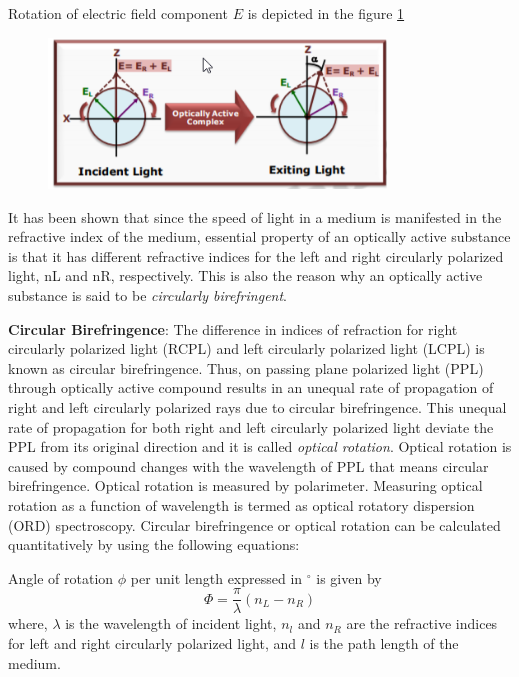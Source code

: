 	Rotation of electric field component $ E $ is depicted  in the figure \ref{fig:polari-fig}
	\begin{figure}[!htb]
		\centering
		\includegraphics[width=0.8\textwidth]{Experiments/Polarimeter-fig1.png}
		\label{fig:polari-fig}
	\end{figure}
	
	It has been shown that since the speed of light in a medium is manifested in the refractive index of the medium, essential property of an optically active substance is that it has different refractive indices for the left and right circularly polarized light, nL and nR, respectively. This is also the reason why an optically active substance is said to be \textit{circularly birefringent}.
	
	{\textbf{Circular Birefringence}}: The difference in indices of refraction for right circularly polarized light (RCPL) and left circularly polarized light (LCPL) is known as circular birefringence. Thus, on passing plane polarized light (PPL) through optically active compound results in an unequal rate of propagation of right and left circularly polarized rays due to circular birefringence. This unequal rate of propagation for both right and left circularly polarized light deviate the PPL from its original direction and it is called \emph{optical rotation}. Optical rotation is caused by compound changes with the wavelength of PPL that means circular birefringence. Optical rotation is measured by polarimeter. Measuring optical rotation as a function of wavelength is termed as optical rotatory dispersion (ORD) spectroscopy. Circular birefringence or optical rotation can be calculated quantitatively by using the following equations:
	
	Angle of rotation $\phi$ per unit length expressed in $^{\circ}$ is given by
	\begin{equation}
		\label{eqn:Angle of rotation per unit length}
		\Phi=\frac{\pi}{\lambda}\left(n_{L}-n_{R}\right)
	\end{equation}
	where, $\lambda$ is the wavelength of incident light, $n_l$ and $n_R$ are the refractive indices for left and right circularly polarized light, and $l$ is the path length of the medium.
	
